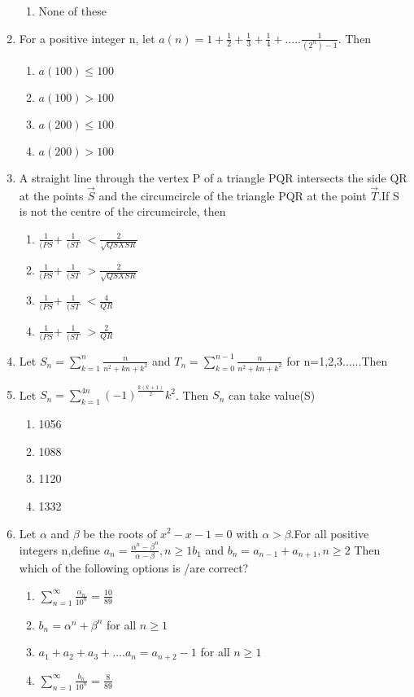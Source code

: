 \begin{enumerate}[label=\arabic*.,ref=\thesubsection.\theenumi]
\begin{enumerate}
\item None of these
\end{enumerate}
\item For a positive integer n, let $a(n)= 1+\frac{1}{2}+\frac{1}{3}+\frac{1}{4}+.....\frac{1}{(2^n)-1}$. Then
\begin{enumerate}
\item $a(100)\leq100$ 
\item $a(100)>100$ 
\item $a(200)\leq100$ 
\item $a(200)>100$
\end{enumerate}
\item A straight line through the vertex P of a triangle PQR intersects the side QR at the points 
$\vec{S}$ and the circumcircle of the triangle PQR at the point $\vec{T}$.If S is not the centre of the circumcircle, then
\begin{enumerate}
\item $\frac{1}{(PS}$+ $\frac{1}{(ST}$ $<\frac{2}{\sqrt{QS X SR}}$ 
\item $\frac{1}{(PS}$+ $\frac{1}{(ST}$ $>\frac{2}{\sqrt{QS X SR}}$  
\item $\frac{1}{(PS}$+ $\frac{1}{(ST}$ $<\frac{4}{QR}$ 
\item $\frac{1}{(PS}$+ $\frac{1}{(ST}$ $>\frac{2}{QR}$
\end{enumerate}
\item Let $S_n=\sum_{k=1}^{n} \frac{n}{n^2+kn+k^2}$ and $T_n=\sum_{k=0}^{n-1}\frac{n}{n^2+kn+k^2}$ for n=1,2,3......Then 
\item Let $S_n=\sum_{k=1}^{4n}(-1)^\frac{k(k+1)}{2}k^2$. Then $S_n$ can take value(S)
\begin{enumerate}
\item 1056 
\item 1088 
\item 1120 
\item 1332
\end{enumerate}
\item Let $\alpha$ and $\beta$ be the roots of $x^2-x-1=0$ with $\alpha > \beta$.For all positive integers n,define $a_n= \frac{\alpha^n - \beta^n}{\alpha-\beta},n\geq 1 b_1$ and $b_n=a_{n-1}+a_{n+1}, n\geq 2$ Then which of the following options is /are correct?
\begin{enumerate}
\item $\sum_{n=1}^{\infty} \frac{\alpha_n}{10^n}=\frac{10}{89}$
\item $b_n=\alpha^n+\beta^n$ for all $n\geq 1$
\item $a_1+a_2+a_3+....a_n=a_{n+2}-1$ for all $n\geq1$
\item $\sum_{n=1}^{\infty}\frac{b_n}{10^n}=\frac{8}{89}$
\end{enumerate} 


\end{enumerate}
